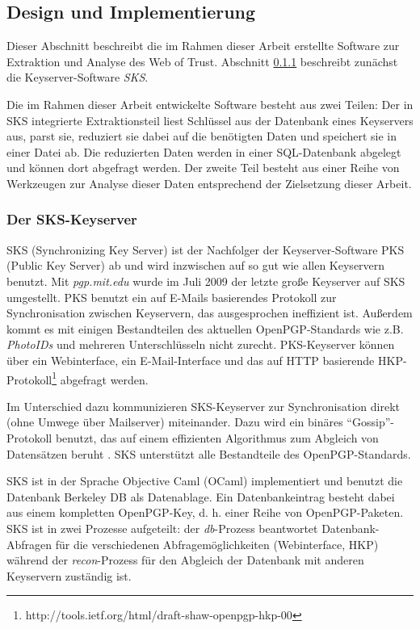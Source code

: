 \subsection{Design und Implementierung}
\label{ch:Grundlagen:sec:Design}

Dieser Abschnitt beschreibt die im Rahmen dieser Arbeit erstellte
Software zur Extraktion und Analyse des Web of Trust. Abschnitt
\ref{ch:Grundlagen:sec:Design:subsec:der-sks-keyserver} beschreibt
zunächst die Keyserver-Software \emph{SKS}.

Die im Rahmen dieser Arbeit entwickelte Software besteht aus zwei
Teilen: Der in SKS integrierte Extraktionsteil liest Schlüssel aus
der Datenbank eines Keyservers aus, parst sie, reduziert sie dabei auf
die benötigten Daten und speichert sie in einer Datei ab. Die
reduzierten Daten werden in einer SQL-Datenbank abgelegt und können
dort abgefragt werden. Der zweite Teil besteht aus einer Reihe von
Werkzeugen zur Analyse dieser Daten entsprechend der Zielsetzung
dieser Arbeit.

\subsubsection{Der SKS-Keyserver}
\label{ch:Grundlagen:sec:Design:subsec:der-sks-keyserver}

SKS (Synchronizing Key Server) ist der Nachfolger der
Keyserver-Software PKS (Public Key Server) ab und wird inzwischen auf
so gut wie allen Keyservern benutzt. Mit \emph{pgp.mit.edu} wurde im
Juli 2009 der letzte große Keyserver auf SKS umgestellt. PKS benutzt
ein auf E-Mails basierendes Protokoll zur Synchronisation zwischen
Keyservern, das ausgesprochen ineffizient ist. Außerdem kommt es mit
einigen Bestandteilen des aktuellen OpenPGP-Standards wie
z.B. \emph{PhotoIDs} und mehreren Unterschlüsseln nicht
zurecht. PKS-Keyserver können über ein Webinterface, ein
E-Mail-Interface und das auf HTTP basierende
HKP-Protokoll\footnote{http://tools.ietf.org/html/draft-shaw-openpgp-hkp-00}
abgefragt werden.

Im Unterschied dazu kommunizieren SKS-Keyserver zur Synchronisation
direkt (ohne Umwege über Mailserver) miteinander.  Dazu wird ein
binäres "`Gossip"'-Protokoll benutzt, das auf einem effizienten
Algorithmus zum Abgleich von Datensätzen beruht
\cite{Minsky2003}. SKS unterstützt alle Bestandteile des
OpenPGP-Standards.

SKS ist in der Sprache Objective Caml (OCaml) implementiert und
benutzt die Datenbank Berkeley DB als Datenablage. Ein
Datenbankeintrag besteht dabei aus einem kompletten OpenPGP-Key,
d. h. einer Reihe von OpenPGP-Paketen. SKS ist in zwei Prozesse
aufgeteilt: der \emph{db}-Prozess beantwortet Datenbank-Abfragen für
die verschiedenen Abfragemöglichkeiten (Webinterface, HKP) während der
\emph{recon}-Prozess für den Abgleich der Datenbank mit anderen
Keyservern zuständig ist.

